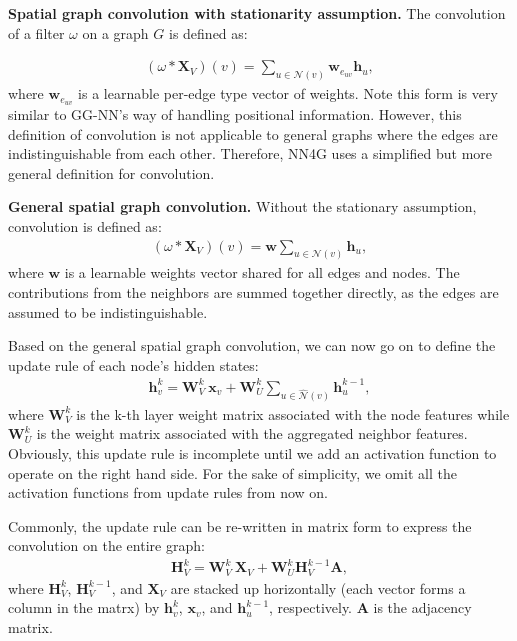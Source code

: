 \vspace{2mm}
\noindent \textbf{Spatial graph convolution with stationarity assumption.} The convolution of a filter $\omega$ on a graph $G$ is defined as:

\begin{gather}
(\omega \ast \mathbf{X}_V) (v) = \sum_{u \in \mathcal {N}(v)} \mathbf{w}_{e_{uv}} \mathbf{h}_u,
\end{gather}
where $\mathbf{w}_{e_{uv}}$ is a learnable per-edge type vector of weights. Note this form is very similar to GG-NN's way of handling positional information. However, this definition of convolution is not applicable to general graphs where the edges are indistinguishable from each other. Therefore, NN4G uses a simplified but more general definition for convolution.

\vspace{2mm}
\noindent \textbf{General spatial graph convolution.} Without the stationary assumption, convolution is defined as:
\begin{gather}
(\omega \ast \mathbf{X}_V) (v)= \mathbf{w} \sum_{u \in \mathcal {N}(v)} \mathbf{h}_u,
\end{gather}
where $\mathbf{w}$ is a learnable weights vector shared for all edges and nodes. The contributions from the neighbors are summed together directly, as the edges are assumed to be indistinguishable. 

Based on the general spatial graph convolution, we can now go on to define the update rule of each node's hidden states:
\begin{gather}
\label{eq:nn4g}
\mathbf{h}_v ^k = \mathbf{W}_V^k~\mathbf{x}_v + \mathbf{W}_U^k \sum_{u \in \hat {\mathcal {N}}(v)} \mathbf{h}_u^{k-1},
\end{gather}
where $\mathbf{W}_V^k$ is the k-th layer weight matrix associated with the node features while $\mathbf{W}_U^k$ is the weight matrix associated with the aggregated neighbor features. Obviously, this update rule is incomplete until we add an activation function to operate on the right hand side. For the sake of simplicity, we omit all the activation functions from update rules from now on.

Commonly, the update rule can be re-written in matrix form to express the convolution on the entire graph:
\begin{gather}
\label{eq:nn4gm}
\mathbf{H}_V^k = \mathbf{W}_V^k~\mathbf{X}_V + \mathbf{W}_U^k \mathbf{H}_V^{k-1} \mathbf{A} ,
\end{gather}
where $\mathbf{H}_V^k$, $\mathbf{H}_V^{k-1}$, and $\mathbf{X}_V$ are stacked up horizontally (each vector forms a column in the matrx) by $\mathbf{h}_v ^k$, $\mathbf{x}_v$, and $\mathbf{h}_u^{k-1}$, respectively. $\mathbf{A}$ is the adjacency matrix.


